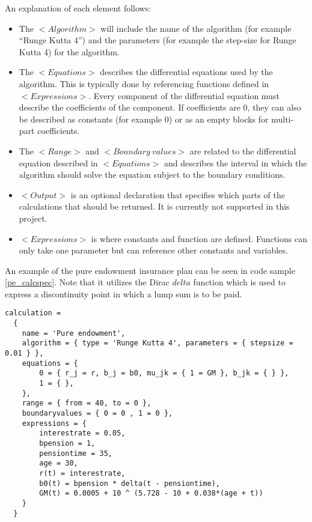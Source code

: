 An explanation of each element follows:
\begin{itemize}
\item The $<Algorithm>$ will include the name of the algorithm (for example ``Runge Kutta 4'') and the parameters (for example the step-size for Runge Kutta 4) for the algorithm.
\item The $<Equations>$ describes the differential equations used by the algorithm. This is typically done by referencing functions defined in $<Expressions>$. Every component of the differential equation must describe the coefficients of the component. If coefficients are 0, they can also be described as constants (for example 0) or as an empty blocks for multi-part coefficients.
\item The $<Range>$ and $<Boundary\ values>$ are related to the differential equation described in $<Equations>$ and describes the interval in which the algorithm should solve the equation subject to the boundary conditions.
\item $<Output>$ is an optional declaration that specifies which parts of the calculations that should be returned. It is currently not supported in this project. %
\item $<Expressions>$ is where constants and function are defined. Functions can only take one parameter but can reference other constants and variables.
\end{itemize}

An example of the pure endowment insurance plan can be seen in code sample \ref{pe_calcspec}. 
Note that it utilizes the Dirac $delta$ function\cite{hassani2009dirac} which is used to express a discontinuity point in which a lump sum is to be paid.%


\begin{lstlisting}[caption=The pure endowment insurance plan expressed in CalcSpec, label=pe_calcspec]
calculation = 
  {
    name = 'Pure endowment',
    algorithm = { type = 'Runge Kutta 4', parameters = { stepsize = 0.01 } },
    equations = { 
        0 = { r_j = r, b_j = b0, mu_jk = { 1 = GM }, b_jk = { } },
        1 = { },
    },
    range = { from = 40, to = 0 },
    boundaryvalues = { 0 = 0 , 1 = 0 },
    expressions = {
        interestrate = 0.05,
        bpension = 1,
        pensiontime = 35,
        age = 30,
        r(t) = interestrate,
        b0(t) = bpension * delta(t - pensiontime),
        GM(t) = 0.0005 + 10 ^ (5.728 - 10 + 0.038*(age + t))
    }
  }
\end{lstlisting}


